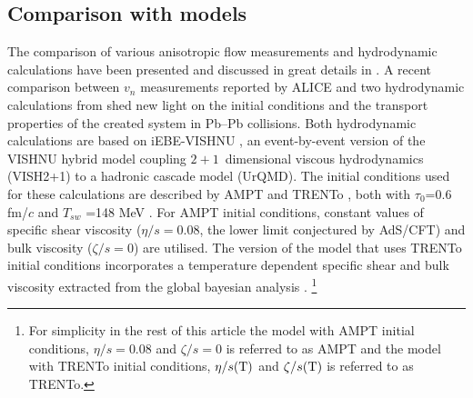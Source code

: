 \documentclass[ALICE,manyauthors]{cernphprep}
\begin{document}
\newpage
\subsection{Comparison with models}
\label{SubSec:hydro}

The comparison of various anisotropic flow measurements and hydrodynamic calculations have been presented and discussed in great details in \cite{Xu:2016hmp, McDonald:2016vlt, Zhao:2017yhj}. A recent comparison between $v_{n}$ measurements reported by ALICE \cite{Acharya:2018zuq} and two hydrodynamic calculations from \cite{Zhao:2017yhj} shed new light on the initial conditions and the transport properties of the created system in Pb--Pb collisions. Both hydrodynamic calculations are based on iEBE-VISHNU \cite{Shen:2014vra}, an event-by-event version of the VISHNU hybrid model \cite{Song:2010aq} coupling $2+1$~dimensional viscous hydrodynamics (VISH2+1) \cite{Song:2007fn} to a hadronic cascade model (UrQMD). The initial conditions used for these calculations are described by AMPT \cite{Lin:2004en} and TRENTo \cite{Moreland:2014oya}, both with $\tau_{0}$=0.6 fm/$c$ and $T_{sw}$ =148 MeV \cite{Bernhard:2016tnd}. For AMPT initial conditions, constant values of specific shear viscosity ($\eta/s =0.08$, the lower limit conjectured by AdS/CFT) and bulk viscosity ($\zeta/s = 0$) are utilised. The version of the model that uses TRENTo \cite{Moreland:2014oya} initial conditions incorporates a temperature dependent specific shear and bulk viscosity extracted from the global bayesian analysis \cite{Bernhard:2016tnd}. \footnote{ For simplicity in the rest of this article the model with AMPT initial conditions, $\eta/s =0.08$ and $\zeta/s =0$ is referred to as AMPT and the model with TRENTo initial conditions, $\eta/s(\rm{T})$ and $\zeta/s(\rm{T})$ is referred to as TRENTo.} 
\end{document}

